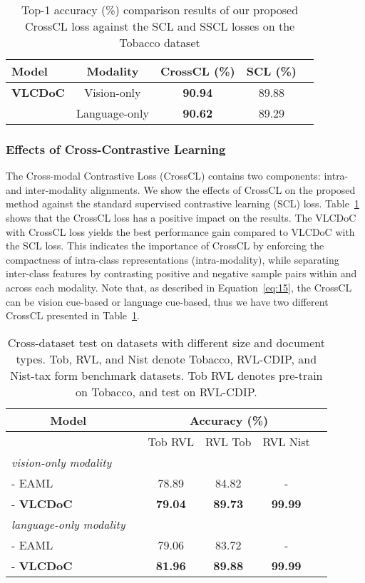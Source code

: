 \documentclass[preprint,review,12pt]{elsarticle}
\begin{document}
\begin{table}[t]
\footnotesize
\centering
\caption{Top-1 accuracy (\%) comparison results of our proposed CrossCL loss against the SCL and SSCL losses on the Tobacco dataset}
{\begin{tabular}{@{}lcccc@{}}
\toprule
Model  & Modality & CrossCL (\%) & SCL (\%) \\
\midrule
\textbf{VLCDoC}   &   Vision-only        &   \textbf{90.94}  &   89.88    \\
                  &   Language-only      &   \textbf{90.62}  &   89.29   \\
\bottomrule
\end{tabular}}
\label{tab:ContrastiveLearningComparison}
\end{table}
\subsubsection{Effects of Cross-Contrastive Learning}
The Cross-modal Contrastive Loss (CrossCL) contains two components: intra- and inter-modality alignments. We show the effects of CrossCL on the proposed method against the standard supervised contrastive learning (SCL) loss.
Table~\ref{tab:ContrastiveLearningComparison} shows that the CrossCL loss has a positive impact on the results. The VLCDoC with CrossCL loss yields the best performance gain compared to VLCDoC with the SCL loss. This indicates the importance of CrossCL by enforcing the compactness of intra-class representations (intra-modality), while separating inter-class features by contrasting positive and negative sample pairs within and across each modality. Note that, as described in Equation~\ref{eq:15}, the CrossCL can be vision cue-based or language cue-based, thus we have two different CrossCL presented in Table~\ref{tab:ContrastiveLearningComparison}.
\begin{table}[t]
\footnotesize
\centering
\caption{Cross-dataset test on datasets with different size and document types. Tob, RVL, and Nist denote Tobacco, RVL-CDIP, and Nist-tax form benchmark datasets. Tob  RVL denotes pre-train on Tobacco, and test on RVL-CDIP.}
{\begin{tabular}{@{}lccccc@{}}
\toprule
\multicolumn{1}{c}{Model}  && \multicolumn{3}{c}{Accuracy (\%)} \\
\midrule
&& Tob  RVL & RVL  Tob & RVL  Nist \\ 
\midrule
\textit{vision-only modality} &  &  \\
 - EAML~\cite{bakkali2021eaml} && 78.89    &   84.82 & - \\
 - \textbf{VLCDoC}              &&  \textbf{79.04} & \textbf{89.73}   &  \textbf{99.99}   \\     
\midrule
\textit{language-only modality} &  &  \\
 - EAML~\cite{bakkali2021eaml} &&  79.06   &  83.72 & -  \\
 - \textbf{VLCDoC}              &&   \textbf{81.96}     &   \textbf{89.88} & \textbf{99.99}  \\
\bottomrule
\end{tabular}}
\label{tab:FineTuningTob}
\end{table}
\end{document}
